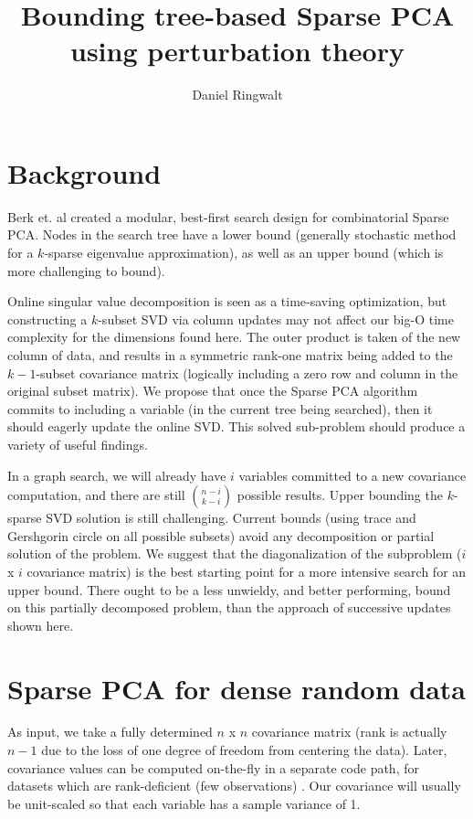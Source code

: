 \documentclass{article}
\title{Bounding tree-based Sparse PCA using perturbation theory}
\author{Daniel Ringwalt}
\begin{document}
	
\maketitle

\section{Background}

Berk et. al \cite{berk2019certifiably} created a modular, best-first search design for combinatorial Sparse PCA. Nodes in the search tree have a lower bound (generally stochastic method for a $k$-sparse eigenvalue approximation), as well as an upper bound (which is more challenging to bound).

Online singular value decomposition \cite{bunch1978updating} is seen as a time-saving optimization, but constructing a $k$-subset SVD via column updates may not affect our big-O time complexity for the dimensions found here. The outer product is taken of the new column of data, and results in a symmetric rank-one matrix being added to the $k-1$-subset covariance matrix (logically including a zero row and column in the original subset matrix). We propose that once the Sparse PCA algorithm commits to including a variable (in the current tree being searched), then it should eagerly update the online SVD. This solved sub-problem should produce a variety of useful findings.

In a graph search, we will already have $i$ variables committed to a new covariance computation, and there are still $\binom{n-i}{k-i}$ possible results. Upper bounding the $k$-sparse SVD solution is still challenging. Current bounds (using trace and Gershgorin circle on all possible subsets) avoid any decomposition or partial solution of the problem. We suggest that the diagonalization of the subproblem ($i$ x $i$ covariance matrix) is the best starting point for a more intensive search for an upper bound. There ought to be a less unwieldy, and better performing, bound on this partially decomposed problem, than the approach of successive updates shown here.

\section{Sparse PCA for dense random data}

As input, we take a fully determined $n$ x $n$ covariance matrix (rank is actually $n-1$ due to the loss of one degree of freedom from centering the data). Later, covariance values can be computed on-the-fly in a separate code path, for datasets which are rank-deficient (few observations) \cite{berk2019certifiably}. Our covariance will usually be unit-scaled so that each variable has a sample variance of 1.
\end{document}
